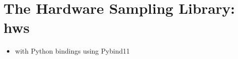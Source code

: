 \section{The Hardware Sampling Library: hws}

\cite{breyer_hws_2024}
\cite{breyer_hardware-independent_2024} %

\begin{itemize}
    \item \cpp with Python bindings using Pybind11 \cite{jakob_pybind11_2017}
\end{itemize}



